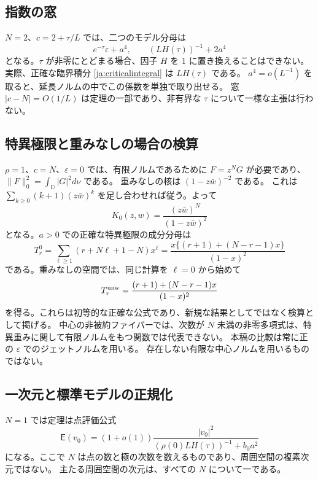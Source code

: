 \documentclass[12pt]{amsart}
\theoremstyle{definition}
\theoremstyle{remark}
\numberwithin{equation}{section}
\newcommand{\D}{\mathbb{D}}
\newcommand{\Cost}{\mathsf E}
\theoremstyle{definition}
\begin{document}
\subsection{指数の窓}
$N=2$、$c=2+\tau/L$ では、二つのモデル分母は
\[
 e^{-\tau}\varepsilon+a^4,
 \qquad (LH(\tau))^{-1}+2a^4
\]
となる。$\tau$ が非零にとどまる場合、因子 $H$ を $1$ に置き換えることはできない。
実際、正確な臨界積分 \eqref{ja:criticalintegral} は $LH(\tau)$ である。
$a^4=o(L^{-1})$ を取ると、延長ノルムの中でこの係数を単独で取り出せる。
窓 $|c-N|=O(1/L)$ は定理の一部であり、非有界な $\tau$ について一様な主張は行わない。

\subsection{特異極限と重みなしの場合の検算}
$\rho=1$、$c=N$、$\varepsilon=0$ では、有限ノルムであるために $F=z^NG$ が必要であり、
$\|F\|_0^2=\int_\D|G|^2d\nu$ である。
重みなしの核は $(1-z\bar w)^{-2}$ である。
これは $\sum_{k\ge0}(k+1)(z\bar w)^k$ を足し合わせれば従う。よって
\begin{equation}\label{ja:singularkernel}
 K_0(z,w)=\frac{(z\bar w)^N}{(1-z\bar w)^2}
\end{equation}
となる。$a>0$ での正確な特異極限の成分分母は
\begin{equation}\label{ja:singularT}
 T_r^0=\sum_{\ell\ge1}(r+N\ell+1-N)x^\ell
 =\frac{x\{(r+1)+(N-r-1)x\}}{(1-x)^2}
\end{equation}
である。重みなしの空間では、同じ計算を $\ell=0$ から始めて
\begin{equation}\label{ja:unweightedT}
 T_r^{\rm unw}=\frac{(r+1)+(N-r-1)x}{(1-x)^2}
\end{equation}
を得る。これらは初等的な正確な公式であり、新規な結果としてではなく検算として掲げる。
中心の非被約ファイバーでは、次数が $N$ 未満の非零多項式は、特異重みに関して有限ノルムをもつ関数では代表できない。
本稿の比較は常に正の $\varepsilon$ でのジェットノルムを用いる。
存在しない有限な中心ノルムを用いるものではない。

\subsection{一次元と標準モデルの正規化}
$N=1$ では定理は点評価公式
\[
 \Cost(v_0)=(1+o(1))
 \frac{|v_0|^2}{(\rho(0)LH(\tau))^{-1}+b_0a^2}
\]
になる。ここで $N$ は点の数と極の次数を数えるものであり、周囲空間の複素次元ではない。
主たる周囲空間の次元は、すべての $N$ について一である。
\end{document}
